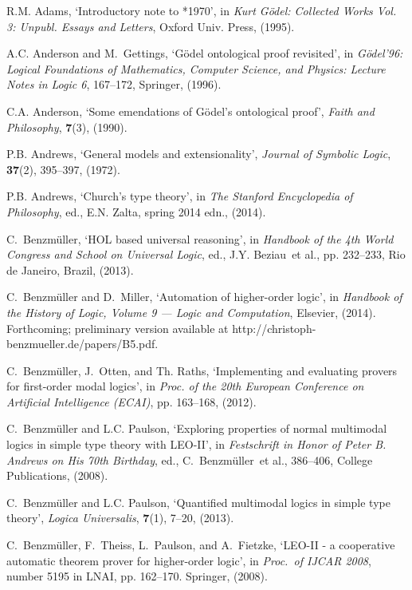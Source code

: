 \documentclass{birkjour}
\theoremstyle{definition}
\theoremstyle{remark}
\numberwithin{equation}{section}
\begin{document}
\begin{thebibliography}{1}

R.M. Adams, `Introductory note to *1970', in {\em {Kurt G\"odel: Collected
  Works Vol. 3: Unpubl. Essays and Letters}}, Oxford Univ. Press, (1995).

A.C. Anderson and M.~Gettings, `G\"odel ontological proof revisited', in {\em
  {G\"odel'96: Logical Foundations of Mathematics, Computer Science, and
  Physics: Lecture Notes in Logic 6}},  167--172, {Springer}, (1996).

C.A. Anderson, `Some emendations of {G{\"o}del's} ontological proof', {\em
  Faith and Philosophy}, {\bf 7}(3), (1990).

P.B. Andrews, `General models and extensionality', {\em Journal of Symbolic
  Logic}, {\bf 37}(2),  395--397, (1972).

P.B. Andrews, `Church's type theory', in {\em The Stanford Encyclopedia of
  Philosophy}, ed., E.N. Zalta, spring 2014 edn., (2014).

C.~Benzm{\"u}ller, `{HOL} based universal reasoning', in {\em Handbook of the
  4th World Congress and School on Universal Logic}, ed., J.Y. Beziau~et al.,
  pp. 232--233, Rio de Janeiro, Brazil, (2013).

C.~Benzm{\"u}ller and D.~Miller, `Automation of higher-order logic', in {\em
  Handbook of the History of Logic, Volume 9 --- Logic and Computation},
  Elsevier, (2014).
\newblock Forthcoming; preliminary version available at
  {http://christoph-benzmueller.de/papers/B5.pdf}.

C.~Benzm{\"u}ller, J.~Otten, and Th. Raths, `Implementing and evaluating
  provers for first-order modal logics', in {\em Proc. of the 20th European
  Conference on Artificial Intelligence (ECAI)}, pp. 163--168, (2012).

C.~Benzm{\"u}ller and L.C. Paulson, `Exploring properties of normal multimodal
  logics in simple type theory with {LEO-II}', in {\em {Festschrift in Honor of
  {Peter B. Andrews} on His 70th Birthday}}, ed., C.~Benzm{\"u}ller~et al.,
  386--406, College Publications, (2008).

C.~Benzm{\"u}ller and L.C. Paulson, `Quantified multimodal logics in simple
  type theory', {\em Logica Universalis}, {\bf 7}(1),  7--20, (2013).

C.~Benzm{\"u}ller, F.~Theiss, L.~Paulson, and A.~Fietzke, `{LEO-II} - a
  cooperative automatic theorem prover for higher-order logic', in {\em
  Proc.~of IJCAR 2008}, number 5195 in LNAI, pp. 162--170. Springer, (2008).


\end{thebibliography}
\end{document}
